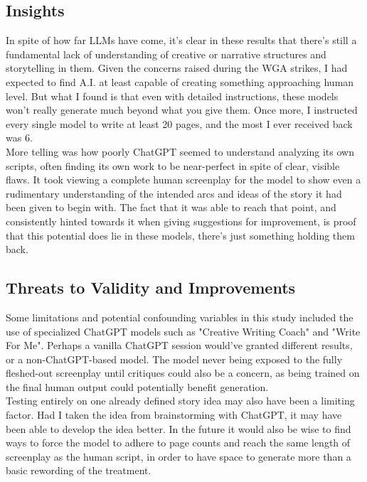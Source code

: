 \documentclass[sigconf]{acmart}
\begin{document}
\subsection{Insights}
\indent In spite of how far LLMs have come, it's clear in these results that there's still a fundamental lack of understanding of creative or narrative structures and storytelling in them. Given the concerns raised during the WGA strikes, I had expected to find A.I. at least capable of creating something approaching human level. But what I found is that even with detailed instructions, these models won't really generate much beyond what you give them. Once more, I instructed every single model to write at least 20 pages, and the most I ever received back was 6.\\
\indent More telling was how poorly ChatGPT seemed to understand analyzing its own scripts, often finding its own work to be near-perfect in spite of clear, visible flaws. It took viewing a complete human screenplay for the model to show even a rudimentary understanding of the intended arcs and ideas of the story it had been given to begin with. The fact that it was able to reach that point, and consistently hinted towards it when giving suggestions for improvement, is proof that this potential does lie in these models, there's just something holding them back.
\subsection{Threats to Validity and Improvements}
\indent Some limitations and potential confounding variables in this study included the use of specialized ChatGPT models such as "Creative Writing Coach" and "Write For Me". Perhaps a vanilla ChatGPT session would've granted different results, or a non-ChatGPT-based model. The model never being exposed to the fully fleshed-out screenplay until critiques could also be a concern, as being trained on the final human output could potentially benefit generation.\\
Testing entirely on one already defined story idea may also have been a limiting factor. Had I taken the idea from brainstorming with ChatGPT, it may have been able to develop the idea better. In the future it would also be wise to find ways to force the model to adhere to page counts and reach the same length of screenplay as the human script, in order to have space to generate more than a basic rewording of the treatment.
\end{document}
